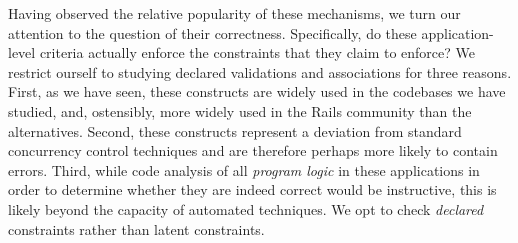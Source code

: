 Having observed the relative popularity of these mechanisms, we turn
our attention to the question of their correctness. Specifically, do
these application-level criteria actually enforce the constraints that
they claim to enforce? We restrict ourself to studying declared
validations and associations for three reasons. First, as we have
seen, these constructs are widely used in the codebases we have
studied, and, ostensibly, more widely used in the Rails community than
the alternatives. Second, these constructs represent a deviation from
standard concurrency control techniques and are therefore perhaps more likely to
contain errors. Third, while code analysis of all \textit{program logic} in
these applications in order to determine whether they are indeed
correct would be instructive, this is likely beyond the capacity of 
automated techniques. We opt to check \textit{declared}
constraints rather than latent constraints.
